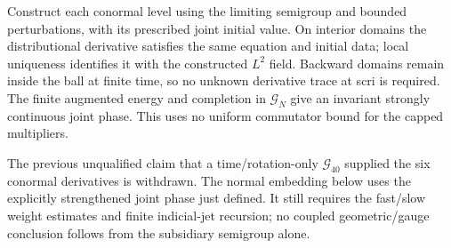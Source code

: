 Construct each conormal level using the limiting semigroup and bounded
perturbations, with its prescribed joint initial value.  On interior domains
the distributional derivative satisfies the same equation and initial data;
local uniqueness identifies it with the constructed $L^2$ field.  Backward
domains remain inside the ball at finite time, so no unknown derivative
trace at scri is required.  The finite augmented energy and completion in
$\mathcal G_N$ give an invariant strongly continuous joint phase.  This uses
no uniform commutator bound for the capped multipliers.

The previous unqualified claim that a time/rotation-only $\mathcal G_{40}$
supplied the six conormal derivatives is withdrawn.  The normal embedding
below uses the explicitly strengthened joint phase just defined.  It still
requires the fast/slow weight estimates and finite indicial-jet recursion;
no coupled geometric/gauge conclusion follows from the subsidiary
semigroup alone.

